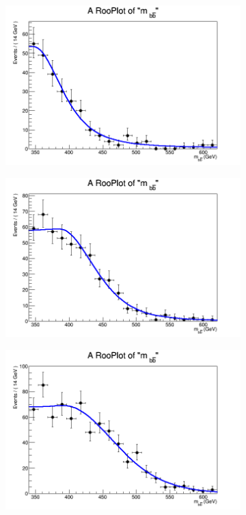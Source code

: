\begin{figure}[phtb!]
  \begin{center}
  \begin{subfigure}[$m_{A}=400$ GeV]{0.4\textwidth}\includegraphics[width=\textwidth]{FitResults/images/fitMC_bAbb400_6.png}\end{subfigure}
  \begin{subfigure}[$m_{A}=450$ GeV]{0.4\textwidth}\includegraphics[width=\textwidth]{FitResults/images/fitMC_bAbb450_6.png}\end{subfigure}
  \begin{subfigure}[$m_{A}=500$ GeV]{0.4\textwidth}\includegraphics[width=\textwidth]{FitResults/images/fitMC_bAbb500_6.png}\end{subfigure}

\end{center}
\end{figure}
